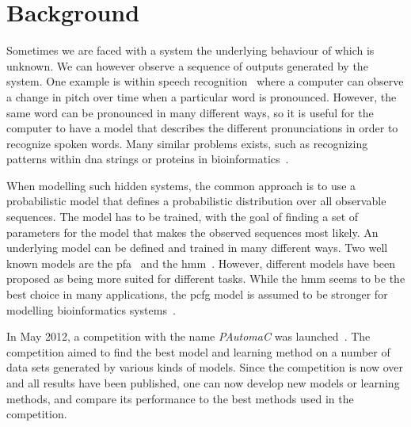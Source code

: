\section{Background}
Sometimes we are faced with a system the underlying behaviour of which is unknown. We can however observe a sequence of outputs generated by the system. One example is within speech recognition~\cite{Rabiner89hmm} where a computer can observe a change in pitch over time when a particular word is pronounced. However, the same word can be pronounced in many different ways, so it is useful for the computer to have a model that describes the different pronunciations in order to recognize spoken words. Many similar problems exists, such as recognizing patterns within \gls{dna} strings or proteins in bioinformatics~\cite{Sakakibara2005}.

When modelling such hidden systems, the common approach is to use a probabilistic model that defines a probabilistic distribution over all observable sequences. The model has to be trained, with the goal of finding a set of parameters for the model that makes the observed sequences most likely. An underlying model can be defined and trained in many different ways. Two well known models are the \gls{pfa}~\cite{pazintroduction} and the \gls{hmm}~\cite{Rabiner89hmm}. However, different models have been proposed as being more suited for different tasks. While the \gls{hmm} seems to be the best choice in many applications, the \gls{pcfg} model is assumed to be stronger for modelling bioinformatics systems~\cite{Sakakibara2005}.

In May 2012, a competition with the name \emph{PAutomaC} was launched~\cite{pautomacTR}. The competition aimed to find the best model and learning method on a number of data sets generated by various kinds of models. Since the competition is now over and all results have been published, one can now develop new models or learning methods, and compare its performance to the best methods used in the competition.